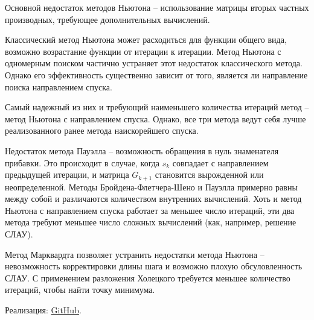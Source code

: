 \documentclass[12pt]{article}
\begin{document}
Основной недостаток методов Ньютона -- использование матрицы вторых частных производных, требующее дополнительных вычислений.

Классический метод Ньютона может расходиться для функции общего вида, возможно возрастание функции от итерации к итерации. Метод Ньютона с одномерным поиском частично устраняет этот недостаток классического метода. Однако его эффективность существенно зависит от того, является ли направление поиска направлением спуска.

Самый надежный из них и требующий наименьшего количества итераций метод -- метод Ньютона с направлением спуска. Однако, все три метода ведут себя лучше реализованного ранее метода наискорейшего спуска.

Недостаток метода Пауэлла -- возможность обращения в нуль знаменателя прибавки. Это происходит в случае, когда $s_k$ совпадает с направлением предыдущей итерации, и матрица $G_{k+1}$ становится вырожденной или неопределенной. Методы Бройдена-Флетчера-Шено и Пауэлла примерно равны между собой и различаются количеством внутренних вычислений. Хоть и метод Ньютона с направлением спуска работает за меньшее число итераций, эти два метода требуют меньшее число сложных вычислений (как, например, решение СЛАУ).

Метод Марквардта позволяет устранить недостатки метода Ньютона -- невозможность корректировки длины шага и возможно плохую обсуловленность СЛАУ. С применением разложения Холецкого требуется меньшее количество итераций, чтобы найти точку минимума.

Реализация: \href{https://github.com/Mr3zee/Newton-Optimization}{GitHub}.
\end{document}
